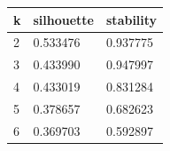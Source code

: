 \begin{tabular}{lll}
\hline
k & silhouette & stability \\
\hline
2 & 0.533476 & 0.937775 \\
3 & 0.433990 & 0.947997 \\
4 & 0.433019 & 0.831284 \\
5 & 0.378657 & 0.682623 \\
6 & 0.369703 & 0.592897 \\
\hline
\end{tabular}
